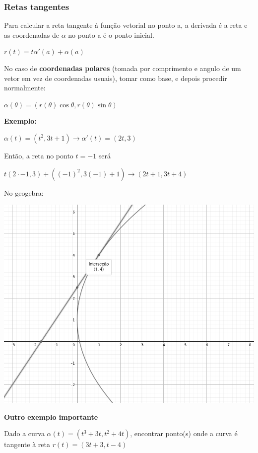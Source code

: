 \documentclass[letterpaper, 11pt]{article}
\begin{document}
\subsubsection{Retas tangentes}
\label{sec:org3b5cd79}
Para calcular a reta tangente à função vetorial no ponto a, a derivada é a reta e as coordenadas de \(\alpha\) no ponto a é o ponto inicial.

\begin{center} $r(t) = t\alpha'(a) + \alpha(a)$ \end{center}

No caso de \textbf{coordenadas polares} (tomada por comprimento e angulo de um vetor em vez de coordenadas usuais), tomar como base, e depois procedir normalmente:

\begin{center} $\alpha(\theta) = (r(\theta)\cos\theta, r(\theta)\sin\theta)$ \end{center}

\textbf{Exemplo:}

\(\alpha(t) = (t^2, 3t+1) \rightarrow \alpha'(t) = (2t, 3)\)

Então, a reta no ponto \(t = -1\) será

\(t(2\cdot-1, 3) + ((-1)^2,3(-1)+1) \rightarrow (2t+1, 3t+4)\)

No geogebra:
\begin{center}
\includegraphics[width=.9\linewidth]{./img/tangente.png}
\end{center}

\textbf{Outro exemplo importante}

Dado a curva \(\alpha(t) = (t^3 +3t, t^2+4t)\), encontrar ponto(s) onde a curva é tangente à reta \(r(t) = (3t+3,t-4)\)
\end{document}

